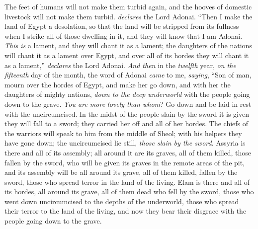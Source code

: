 \begin{biblechapter}
The feet of humans will not make them turbid again, 
and the hooves of domestic livestock will not make them turbid. \textit{declares} the Lord Adonai.
\verse “Then I make the land of Egypt a desolation, 
so that the land will be stripped from its fullness 
when I strike all of those dwelling in it, 
and they will know that I am Adonai.
\verse \textit{This is} a lament, and they will chant it as a lament; the daughters of the nations will chant it as a lament over Egypt, and over all of its hordes they will chant it as a lament,” \textit{declares} the Lord Adonai.
\verse \textit{And then} in the \textit{twelfth} year, \textit{on the fifteenth} day of the month, the word of Adonai \textit{came} to me, \textit{saying},
\verse “Son of man, mourn over the hordes of Egypt, and make her go down, and with her the daughters of mighty nations, \textit{down to the deep underworld} with the people going down to the grave.
\verse \textit{You are more lovely than whom}? Go down and be laid in rest with the uncircumcised.
\verse In the midst of the people slain by the sword it is given they will fall to a sword; they carried her off and all of her hordes.
\verse The chiefs of the warriors will speak to him from the middle of Sheol; with his helpers they have gone down; the uncircumcised lie still, \textit{those slain by the sword}.
\verse Assyria is there and all of its assembly; all around it are its graves, all of them killed, those fallen by the sword,
\verse who will be given its graves in the remote areas of the pit, and its assembly will be all around its grave, all of them killed, fallen by the sword, those who spread terror in the land of the living.
\verse Elam is there and all of its hordes, all around its grave, all of them dead who fell by the sword, those who went down uncircumcised to the depths of the underworld, those who spread their terror to the land of the living, and now they bear their disgrace with the people going down to the grave.

\end{biblechapter}
